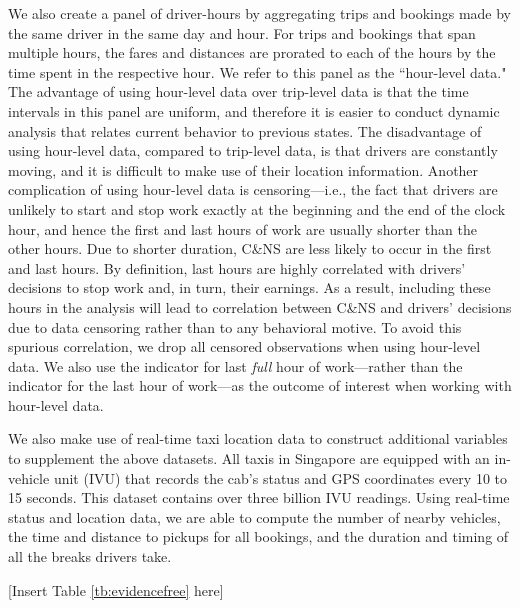 \documentclass[reviewmode]{restud}
\begin{document}
We also create a panel of driver-hours by aggregating trips and bookings made by the same driver in the same day and hour. For trips and bookings that span multiple hours, the fares and distances are prorated to each of the hours by the time spent in the respective hour. We refer to this panel as the ``hour-level data." The advantage of using hour-level data over trip-level data is that the time intervals in this panel are uniform, and therefore it is easier to conduct dynamic analysis that relates current behavior to previous states. The disadvantage of using hour-level data, compared to trip-level data, is that drivers are constantly moving, and it is difficult to make use of their location information. Another complication of using hour-level data is censoring---i.e., the fact that drivers are unlikely to start and stop work exactly at the beginning and the end of the clock hour, and hence the first and last hours of work are usually shorter than the other hours. Due to shorter duration, C\&NS are less likely to occur in the first and last hours. By definition, last hours are highly correlated with drivers' decisions to stop work and, in turn, their earnings. As a result, including these hours in the analysis will lead to correlation between C\&NS and drivers' decisions due to data censoring rather than to any behavioral motive. To avoid this spurious correlation, we drop all censored observations when using hour-level data. We also use the indicator for last \emph{full} hour of work---rather than the indicator for the last hour of work---as the outcome of interest when working with hour-level data.

We also make use of real-time taxi location data to construct additional variables to supplement the above datasets. All taxis in Singapore are equipped with an in-vehicle unit (IVU) that records the cab's status and GPS coordinates every 10 to 15 seconds. This dataset contains over three billion IVU readings. Using real-time status and location data, we are able to compute the number of nearby vehicles, the time and distance to pickups for all bookings, and the duration and timing of all the breaks drivers take.

\begin{center}
	[Insert Table \ref{tb:evidencefree} here]
\end{center}
\end{document}
